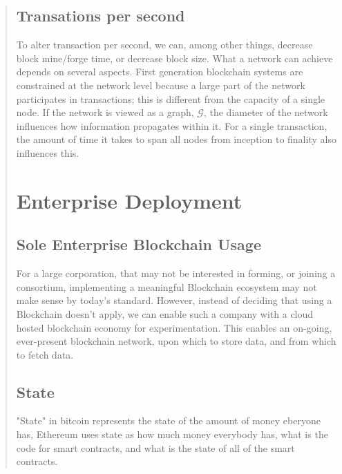 \documentclass[12pt, titlepage, twocolumn]{report}
\begin{document}
\begin{quotation}
\section{Transations per second}
To alter transaction per second, we can, among other things, decrease block mine/forge time, or decrease block size. What a network can achieve depends on several aspects. First generation blockchain systems are constrained at the network level because a large part of the network participates in transactions; this is different from the capacity of a single node. If the network is viewed as a graph, \(\mathcal{G}\), the diameter of the network influences how information propagates within it. For a single transaction, the amount of time it takes to span all nodes from inception to finality also influences this.














\chapter{Enterprise Deployment}

\section{Sole Enterprise Blockchain Usage}
For a large corporation, that may not be interested in forming, or joining a consortium, implementing a meaningful Blockchain ecosystem may not make sense by today's standard. However, instead of deciding that using a Blockchain doesn't apply, we can enable such a company with a cloud hosted blockchain economy for experimentation. This enables an on-going, ever-present blockchain network, upon which to store data, and from which to fetch data. 

\section{State}
"State" in bitcoin represents the state of the amount of money eberyone has, Ethereum uses state as how much money everybody has, what is the code for smart contracts, and what is the state of all of the smart contracts.



\end{quotation}
\end{document}

